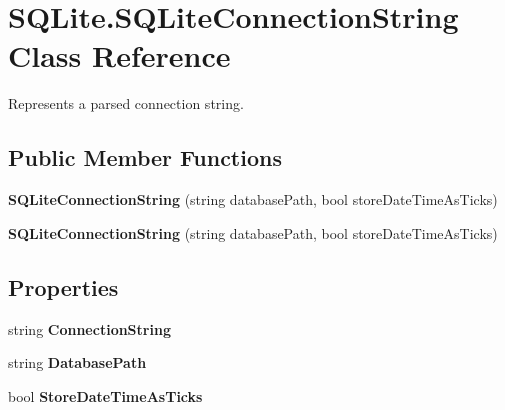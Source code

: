 \hypertarget{classSQLite_1_1SQLiteConnectionString}{\section{S\-Q\-Lite.\-S\-Q\-Lite\-Connection\-String Class Reference}
\label{classSQLite_1_1SQLiteConnectionString}
}


Represents a parsed connection string.  


\subsection*{Public Member Functions}
\begin{DoxyCompactItemize}
\item 
\hypertarget{classSQLite_1_1SQLiteConnectionString_ae5ec4b3dabdbb7c581d0931382fb06ef}{{\bfseries S\-Q\-Lite\-Connection\-String} (string database\-Path, bool store\-Date\-Time\-As\-Ticks)}\label{classSQLite_1_1SQLiteConnectionString_ae5ec4b3dabdbb7c581d0931382fb06ef}

\item 
\hypertarget{classSQLite_1_1SQLiteConnectionString_ae5ec4b3dabdbb7c581d0931382fb06ef}{{\bfseries S\-Q\-Lite\-Connection\-String} (string database\-Path, bool store\-Date\-Time\-As\-Ticks)}\label{classSQLite_1_1SQLiteConnectionString_ae5ec4b3dabdbb7c581d0931382fb06ef}

\end{DoxyCompactItemize}
\subsection*{Properties}
\begin{DoxyCompactItemize}
\item 
\hypertarget{classSQLite_1_1SQLiteConnectionString_a812a424f142ee1caf51829d9d2be659c}{string {\bfseries Connection\-String}}\label{classSQLite_1_1SQLiteConnectionString_a812a424f142ee1caf51829d9d2be659c}

\item 
\hypertarget{classSQLite_1_1SQLiteConnectionString_a1277244d18dd5c49680f578a21465ced}{string {\bfseries Database\-Path}}\label{classSQLite_1_1SQLiteConnectionString_a1277244d18dd5c49680f578a21465ced}

\item 
\hypertarget{classSQLite_1_1SQLiteConnectionString_ac5aba8cfc04a11fcbef17bb097e2f625}{bool {\bfseries Store\-Date\-Time\-As\-Ticks}}\label{classSQLite_1_1SQLiteConnectionString_ac5aba8cfc04a11fcbef17bb097e2f625}

\end{DoxyCompactItemize}



